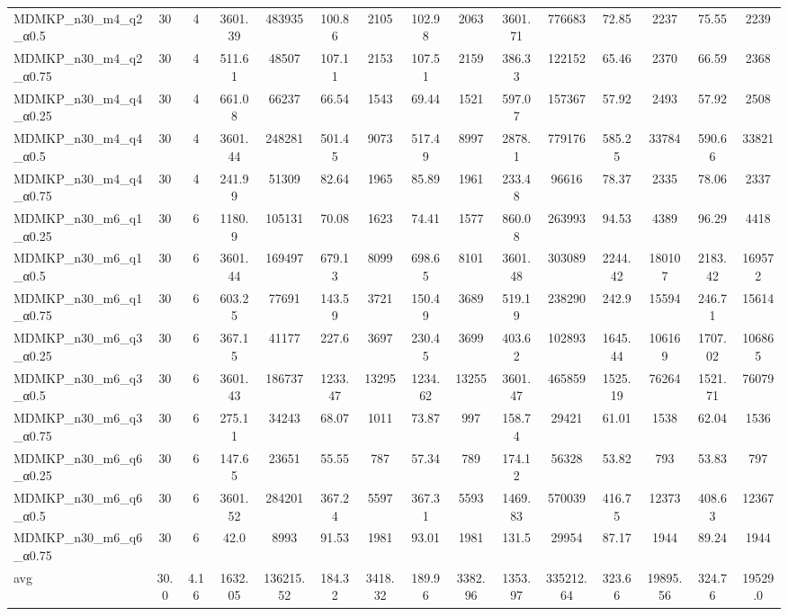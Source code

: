 \begin{table}[!ht]
{\begin{tabular}{lcccccccccccccc}
MDMKP\_n30\_m4\_q2\_α0.5 & 30 & 4 & 3601.39 & 483935 & 100.86 & 2105 & 102.98 & 2063 & 3601.71 & 776683 & 72.85 & 2237 & 75.55 & 2239 \\
MDMKP\_n30\_m4\_q2\_α0.75 & 30 & 4 & 511.61 & 48507 & 107.11 & 2153 & 107.51 & 2159 & 386.33 & 122152 & 65.46 & 2370 & 66.59 & 2368 \\
MDMKP\_n30\_m4\_q4\_α0.25 & 30 & 4 & 661.08 & 66237 & 66.54 & 1543 & 69.44 & 1521 & 597.07 & 157367 & 57.92 & 2493 & 57.92 & 2508 \\
MDMKP\_n30\_m4\_q4\_α0.5 & 30 & 4 & 3601.44 & 248281 & 501.45 & 9073 & 517.49 & 8997 & 2878.1 & 779176 & 585.25 & 33784 & 590.66 & 33821 \\
MDMKP\_n30\_m4\_q4\_α0.75 & 30 & 4 & 241.99 & 51309 & 82.64 & 1965 & 85.89 & 1961 & 233.48 & 96616 & 78.37 & 2335 & 78.06 & 2337 \\
MDMKP\_n30\_m6\_q1\_α0.25 & 30 & 6 & 1180.9 & 105131 & 70.08 & 1623 & 74.41 & 1577 & 860.08 & 263993 & 94.53 & 4389 & 96.29 & 4418 \\
MDMKP\_n30\_m6\_q1\_α0.5 & 30 & 6 & 3601.44 & 169497 & 679.13 & 8099 & 698.65 & 8101 & 3601.48 & 303089 & 2244.42 & 180107 & 2183.42 & 169572 \\
MDMKP\_n30\_m6\_q1\_α0.75 & 30 & 6 & 603.25 & 77691 & 143.59 & 3721 & 150.49 & 3689 & 519.19 & 238290 & 242.9 & 15594 & 246.71 & 15614 \\
MDMKP\_n30\_m6\_q3\_α0.25 & 30 & 6 & 367.15 & 41177 & 227.6 & 3697 & 230.45 & 3699 & 403.62 & 102893 & 1645.44 & 106169 & 1707.02 & 106865 \\
MDMKP\_n30\_m6\_q3\_α0.5 & 30 & 6 & 3601.43 & 186737 & 1233.47 & 13295 & 1234.62 & 13255 & 3601.47 & 465859 & 1525.19 & 76264 & 1521.71 & 76079 \\
MDMKP\_n30\_m6\_q3\_α0.75 & 30 & 6 & 275.11 & 34243 & 68.07 & 1011 & 73.87 & 997 & 158.74 & 29421 & 61.01 & 1538 & 62.04 & 1536 \\
MDMKP\_n30\_m6\_q6\_α0.25 & 30 & 6 & 147.65 & 23651 & 55.55 & 787 & 57.34 & 789 & 174.12 & 56328 & 53.82 & 793 & 53.83 & 797 \\
MDMKP\_n30\_m6\_q6\_α0.5 & 30 & 6 & 3601.52 & 284201 & 367.24 & 5597 & 367.31 & 5593 & 1469.83 & 570039 & 416.75 & 12373 & 408.63 & 12367 \\
MDMKP\_n30\_m6\_q6\_α0.75 & 30 & 6 & 42.0 & 8993 & 91.53 & 1981 & 93.01 & 1981 & 131.5 & 29954 & 87.17 & 1944 & 89.24 & 1944 \\
\hline avg & 30.0 & 4.16 & 1632.05& 136215.52 & 184.32& 3418.32 & 189.96& 3382.96 & 1353.97& 335212.64 & 323.66& 19895.56 & 324.76& 19529.0\\ \hline

\end{tabular}}
\end{table}
